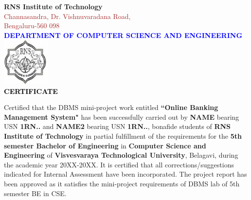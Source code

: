 \begin{titlepage}
\begin{center}
\break\break
\textup{\large {\textcolor{darkbrown}{\bf RNS Institute of Technology}} \\ 
{\normalsize{\textcolor{brown}{Channasandra, Dr. Vishnuvaradana Road,\\ Bengaluru-560 098}}}}\\[0.1in]
\textup{\normalsize {\textcolor{blue}{\bf DEPARTMENT OF COMPUTER SCIENCE AND ENGINEERING}}}\\[0.1in]
\includegraphics[width=0.18\textwidth]{./RNSIT.jpg}\\[0.1in]
\textup{\large {\textcolor{black}{\textbf {CERTIFICATE}}}} \\[0.1in]
\end{center}
\raggedright{
\textup{\hspace{0.5in} Certified that the DBMS mini-project work entitled {\textbf{``Online Banking Management System"}} has been successfully carried out by {\textbf{NAME}} bearing USN {\textbf{1RN..}} and {\textbf{NAME2}} bearing USN {\textbf{1RN..}}, bonafide students of {\textbf{RNS Institute of Technology }} in partial fulfillment of the requirements for the {\textbf{5th semester Bachelor of Engineering}} in {\textbf{Computer Science and Engineering}} of {\textbf{Visvesvaraya Technological University}}, Belagavi, during the academic year 20XX-20XX. It is certified that all corrections/suggestions indicated for Internal Assessment have been incorporated. The project report has been approved as it satisfies the mini-project requirements of DBMS lab of 5th semester BE in CSE.}\\[0.7in]
}
\end{titlepage}
